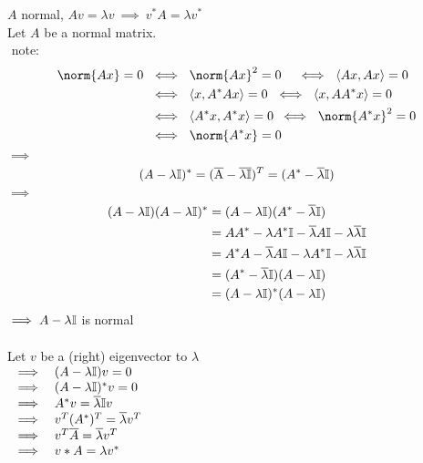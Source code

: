 \begin{SolutionSheet}[\ref{sheet2}]
  \begin{Solution}
    \Claim $A$ normal, $Av = \lambda v \ 
      \implies \ v^* A = \lambda v^*$ \\
    \Proof Let $A$ be a normal matrix. \\
    $ $ note: \begin{equation*}
      \begin{split}
        \norm{Ax} = 0 \ &\iff \ \norm{Ax}^2 = 0 \quad 
          \iff \ \langle Ax,Ax \rangle = 0 \\
          &\iff \ \langle x, A^*Ax \rangle = 0 \ 
          \iff \ \langle x, AA^*x \rangle = 0 \\
          &\iff \  \langle A^*x,A^*x\rangle = 0 \: 
          \iff \ \norm{A^*x}^2 = 0 \\
          &\iff \ \norm{A^*x} = 0
      \end{split}
    \end{equation*}
    $\implies$ \begin{equation*}
      (A - \lambda \mathbb{I})^* 
        = (\overline{\rm A} - \overline{\rm \lambda \mathbb{I}})^T 
        = (A^* - \overline{\lambda} \mathbb{I}) 
    \end{equation*}
    $ \implies$ \begin{align*} 
      (A - \lambda \mathbb{I})(A - \lambda \mathbb{I})^* &= (A - \lambda \mathbb{I})(A^* - \overline{\lambda} \mathbb{I}) \\
      &= AA^* - \lambda A^*\mathbb{I} - \overline{\lambda} A \mathbb{I} - \lambda \overline{\lambda} \mathbb{I} \\
      &= A^*A - \overline{\lambda} A \mathbb{I} - \lambda A^*\mathbb{I} - \lambda \overline{\lambda} \mathbb{I} \\
      &= (A^* - \overline{\lambda} \mathbb{I})(A - \lambda \mathbb{I}) \\
      &= (A - \lambda \mathbb{I})^* (A - \lambda \mathbb{I})
    \end{align*}
    $ \implies A - \lambda \mathbb{I}$ is normal\\
    \\
    Let $v$ be a (right) eigenvector to $\lambda$ \\
    $\begin{array}{ll}      
      \implies &(A- \lambda \mathbb{I})v = 0 \\
      \implies &(A- \lambda \mathbb{I})^*v = 0 \\
      \implies &A^*v = \overline{\lambda} \mathbb{I} v \\
      \implies &v^T(A^*)^T = \overline{\lambda} v^T \\
      \implies &v^T \overline{A} = \overline{\lambda} v^T \\
      \implies &v*A = \lambda v^*
    \end{array}$


\end{Solution}
\end{SolutionSheet}
